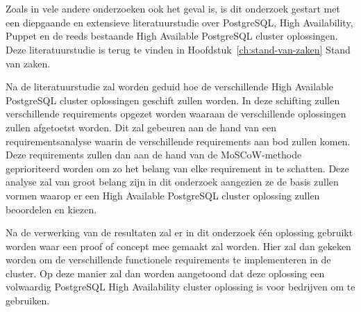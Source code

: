 
\chapter{}
\label{ch:methodologie}


Zoals in vele andere onderzoeken ook het geval is, is dit onderzoek gestart met een diepgaande en extensieve literatuurstudie over PostgreSQL, High Availability, Puppet en de reeds bestaande High Available PostgreSQL cluster oplossingen. Deze literatuurstudie is terug te vinden in Hoofdstuk~\ref{ch:stand-van-zaken} Stand van zaken.

Na de literatuurstudie zal worden geduid hoe de verschillende High Available PostgreSQL cluster oplossingen geschift zullen worden. In deze schifting zullen verschillende requirements opgezet worden waaraan de verschillende oplossingen zullen afgetoetst worden. Dit zal gebeuren aan de hand van een requirementsanalyse waarin de verschillende requirements aan bod zullen komen. Deze requirements zullen dan aan de hand van de MoSCoW-methode geprioriteerd worden om zo het belang van elke requirement in te schatten. Deze analyse zal van groot belang zijn in dit onderzoek aangezien ze de basis zullen vormen waarop er een High Available PostgreSQL cluster oplossing zullen beoordelen en kiezen.


Na de verwerking van de resultaten zal er in dit onderzoek één oplossing gebruikt worden waar een proof of concept mee gemaakt zal worden. Hier zal dan gekeken worden om de verschillende functionele requirements te implementeren in de cluster. Op deze manier zal dan worden aangetoond dat deze oplossing een volwaardig PostgreSQL High Availability cluster oplossing is voor bedrijven om te gebruiken.%

